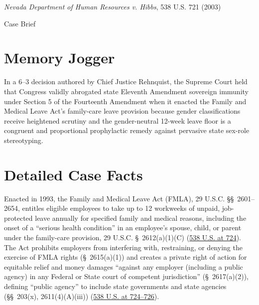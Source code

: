 \documentclass[12pt]{article}
\begin{document}
\begin{center}
{\LARGE \textit{Nevada Department of Human Resources v. Hibbs}, 538 U.S. 721 (2003)\par}
\vspace{0.8em}
{\large Case Brief\par}
\end{center}
\vspace{1em}

\section{Memory Jogger}
In a 6--3 decision authored by Chief Justice Rehnquist, the Supreme Court held that Congress validly abrogated state Eleventh Amendment sovereign immunity under Section 5 of the Fourteenth Amendment when it enacted the Family and Medical Leave Act's family-care leave provision because gender classifications receive heightened scrutiny and the gender-neutral 12-week leave floor is a congruent and proportional prophylactic remedy against pervasive state sex-role stereotyping.

\section{Detailed Case Facts}
Enacted in 1993, the Family and Medical Leave Act (FMLA), 29 U.S.C. \S\S~2601--2654, entitles eligible employees to take up to 12 workweeks of unpaid, job-protected leave annually for specified family and medical reasons, including the onset of a ``serious health condition'' in an employee's spouse, child, or parent under the family-care provision, 29 U.S.C. \S~2612(a)(1)(C) (\href{https://supreme.justia.com/cases/federal/us/538/721/}{538 U.S. at 724}). The Act prohibits employers from interfering with, restraining, or denying the exercise of FMLA rights (\S~2615(a)(1)) and creates a private right of action for equitable relief and money damages ``against any employer (including a public agency) in any Federal or State court of competent jurisdiction'' (\S~2617(a)(2)), defining ``public agency'' to include state governments and state agencies (\S\S~203(x), 2611(4)(A)(iii)) (\href{https://supreme.justia.com/cases/federal/us/538/721/}{538 U.S. at 724--726}).
\end{document}

